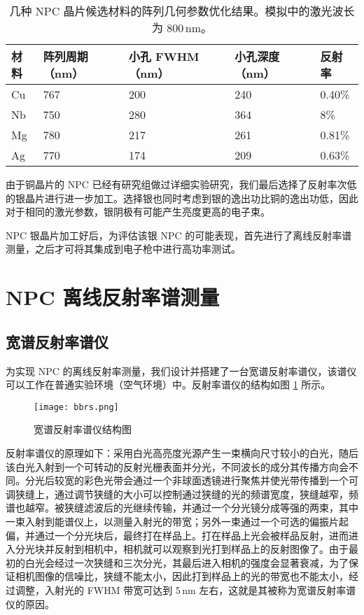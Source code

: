 \begin{table}[htbp]
\caption{\label{tab:opt}几种 NPC 晶片候选材料的阵列几何参数优化结果。模拟中的激光波长为 800\,nm。}
\begin{center}
\begin{tabular}{lllll}
\toprule
材料 & 阵列周期（nm）& 小孔 FWHM（nm）& 小孔深度（nm）& 反射率 \\
\midrule
Cu & 767 & 200 & 240 & 0.40\% \\
Nb & 750 & 280 & 364 & 8\% \\
Mg & 780 & 217 & 261 & 0.81\% \\
Ag & 770 & 174 & 209 & 0.63\% \\
\bottomrule
\end{tabular}
\end{center}
\end{table}
由于铜晶片的 NPC 已经有研究组做过详细实验研究，我们最后选择了反射率次低的银晶片进行进一步加工。选择银也同时考虑到银的逸出功比铜的逸出功低，因此对于相同的激光参数，银阴极有可能产生亮度更高的电子束。

NPC 银晶片加工好后，为评估该银 NPC 的可能表现，首先进行了离线反射率谱测量，之后才可将其集成到电子枪中进行高功率测试。

\section{NPC 离线反射率谱测量}
\subsection{宽谱反射率谱仪}
为实现 NPC 的离线反射率测量，我们设计并搭建了一台宽谱反射率谱仪，该谱仪可以工作在普通实验环境（空气环境）中。反射率谱仪的结构如图 \ref{fig:bbrs} 所示。
\begin{figure}[htbp]
\centering
\texttt{[image: bbrs.png]}
\caption{\label{fig:bbrs} 宽谱反射率谱仪结构图}
\end{figure}

反射率谱仪的原理如下：采用白光高亮度光源产生一束横向尺寸较小的白光，随后该白光入射到一个可转动的反射光栅表面并分光，不同波长的成分其传播方向会不同。分光后较宽的彩色光带会通过一个非球面透镜进行聚焦并使光带传播到一个可调狭缝上，通过调节狭缝的大小可以控制通过狭缝的光的频谱宽度，狭缝越窄，频谱也越窄。被狭缝滤波后的光继续传输，并通过一个分光镜分成等强的两束，其中一束入射到能谱仪上，以测量入射光的带宽；另外一束通过一个可选的偏振片起偏，并通过一个分光块后，最终打在样品上。打在样品上光会被样品反射，进而进入分光块并反射到相机中，相机就可以观察到光打到样品上的反射图像了。由于最初的白光会经过一次狭缝和三次分光，其最后进入相机的强度会显著衰减，为了保证相机图像的信噪比，狭缝不能太小，因此打到样品上的光的带宽也不能太小，经过调整，入射光的 FWHM 带宽可达到 5\,nm 左右，这就是其被称为宽谱反射率谱仪的原因。

